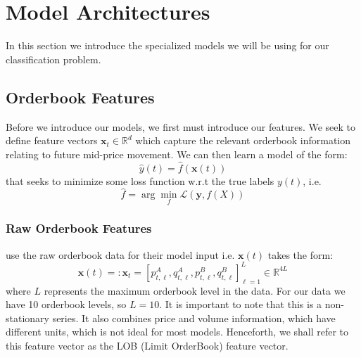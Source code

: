 \section{Model Architectures}
In this section we introduce the specialized models we will be using for our classification problem.

\subsection{Orderbook Features}
Before we introduce our models, we first must introduce our features.
We seek to define feature vectors $\bm{x}_t \in \mathbb{R}^d$ which capture the relevant orderbook 
information relating to future mid-price movement. We can then learn a model of the form:
\begin{equation}
    \hat{y}(t) = \hat{f}(\bm{x}(t))
\end{equation}
that seeks to minimize some loss function w.r.t the true labels $y(t)$, i.e.
\begin{equation}
   \hat{f} = \arg \min_{f} \mathcal{L}(\bm{y}, f(X))
\end{equation}

\subsubsection{Raw Orderbook Features}
\cite{ZHANG2019} use the raw orderbook data for their model input i.e. $\bm{x}(t)$ takes the form:
\begin{equation}
    \bm{x}(t) =: \bm{x}_t = [p_{t, \ell}^A, q_{t, \ell}^A, p_{t, \ell}^B, q_{t, \ell}^B]_{\ell=1}^{L} \in \mathbb{R}^{4L}
    \label{LOB_feature_vector}
\end{equation}
where $L$ represents the maximum orderbook level in the data. For our data we have 10 orderbook
levels, so $L=10$. It is important to note that this is a non-stationary series.
It also combines price and volume information, which have different units, which is not ideal for most models.
Henceforth, we shall refer to this feature vector as the LOB (Limit OrderBook) feature vector.


